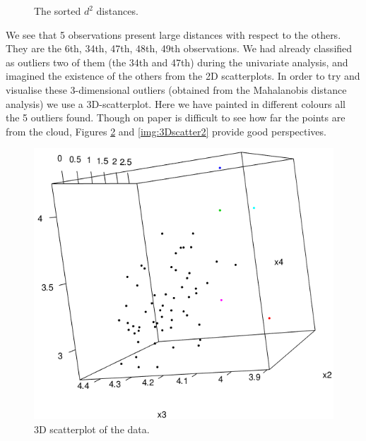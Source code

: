 \documentclass[a4paper,11pt,oneside]{report}
\begin{document}
	\begin{figure}[H]
	\centering
	\begin{varwidth}{\linewidth}
	
	\end{varwidth}
	\caption{The sorted $d^2$ distances.}
	\label{img:sorted_Mahalanobis}
	\end{figure}
	We see that 5 observations present large distances with respect to the others. They are the 6th, 34th, 47th, 48th, 49th observations. We had already classified as outliers two of them (the 34th and 47th) during the univariate analysis, and imagined the existence of the others from the 2D scatterplots.
	In order to try and visualise these 3-dimensional outliers (obtained from the Mahalanobis distance analysis) we use a 3D-scatterplot. Here we have painted in different colours all the 5 outliers found. Though on paper is difficult to see how far the points are from the cloud, Figures \ref{img:3Dscatter1} and \ref{img:3Dscatter2} provide good perspectives.
	\newline
	\begin{figure}[h]
	\centering
	\begin{varwidth}{\linewidth}
	\includegraphics[scale = 0.68]{3dplot1.png}
	\end{varwidth}
	\caption{3D scatterplot of the data.}
	\label{img:3Dscatter1}
	\end{figure}
\end{document}

